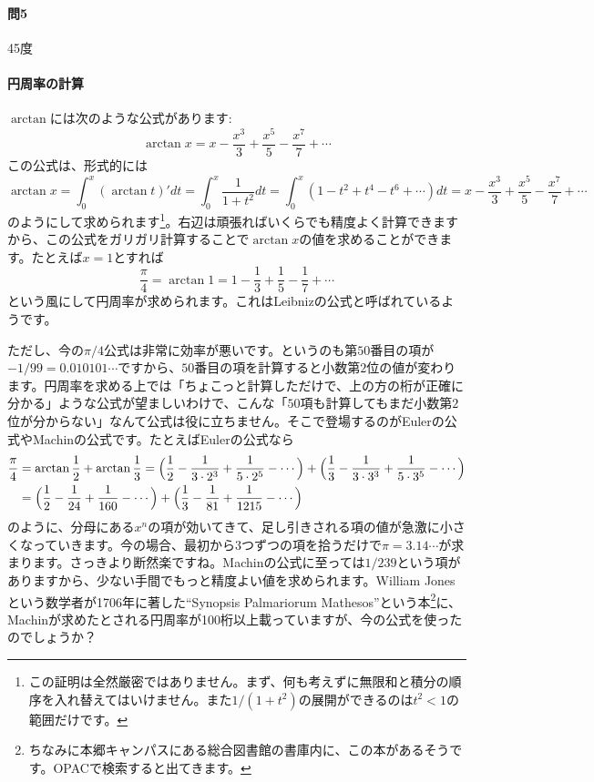 \paragraph{問5} 45度

\paragraph{円周率の計算}

$\arctan$には次のような公式があります:
\[
\arctan x = x - \frac{x^3}{3} + \frac{x^5}{5} - \frac{x^7}{7} + \cdots
\]
この公式は、形式的には
\[
\arctan x = \int_0^x (\arctan t)' dt = \int_0^x \frac{1}{1+t^2} dt = \int_0^x (1-t^2+t^4-t^6+\cdots) dt
= x - \frac{x^3}{3} + \frac{x^5}{5} - \frac{x^7}{7} + \cdots
\]
のようにして求められます\footnote{この証明は全然厳密ではありません。まず、何も考えずに無限和と積分の順序を入れ替えてはいけません。また$1/(1+t^2)$の展開ができるのは$t^2<1$の範囲だけです。}。右辺は頑張ればいくらでも精度よく計算できますから、この公式をガリガリ計算することで$\arctan x$の値を求めることができます。たとえば$x=1$とすれば
\[
\frac{\pi}{4} = \arctan 1 = 1 - \frac{1}{3} + \frac{1}{5} - \frac{1}{7} + \cdots
\]
という風にして円周率が求められます。これはLeibnizの公式と呼ばれているようです。

ただし、今の$\pi/4$公式は非常に効率が悪いです。というのも第$50$番目の項が$-1/99 = 0.010101\cdots$ですから、$50$番目の項を計算すると小数第$2$位の値が変わります。円周率を求める上では「ちょこっと計算しただけで、上の方の桁が正確に分かる」ような公式が望ましいわけで、こんな「$50$項も計算してもまだ小数第$2$位が分からない」なんて公式は役に立ちません。そこで登場するのがEulerの公式やMachinの公式です。たとえばEulerの公式なら
\begin{align*}
\frac{\pi}{4}
&= \arctan \frac{1}{2} + \arctan \frac{1}{3}
= \Bigl(\frac{1}{2} - \frac{1}{3\cdot 2^3} + \frac{1}{5\cdot 2^5} - \cdots\Bigr)
+ \Bigl(\frac{1}{3} - \frac{1}{3\cdot 3^3} + \frac{1}{5\cdot 3^5} - \cdots\Bigr) \\
&= \Bigl(\frac{1}{2} - \frac{1}{24} + \frac{1}{160} - \cdots\Bigr)
+ \Bigl(\frac{1}{3} - \frac{1}{81} + \frac{1}{1215} - \cdots\Bigr)
\end{align*}
のように、分母にある$x^n$の項が効いてきて、足し引きされる項の値が急激に小さくなっていきます。今の場合、最初から$3$つずつの項を拾うだけで$\pi=3.14\cdots$が求まります。さっきより断然楽ですね。Machinの公式に至っては$1/239$という項がありますから、少ない手間でもっと精度よい値を求められます。William Jonesという数学者が1706年に著した``Synopsis Palmariorum Mathesos''という本\footnote{ちなみに本郷キャンパスにある総合図書館の書庫内に、この本があるそうです。OPACで検索すると出てきます。}に、Machinが求めたとされる円周率が100桁以上載っていますが、今の公式を使ったのでしょうか？

